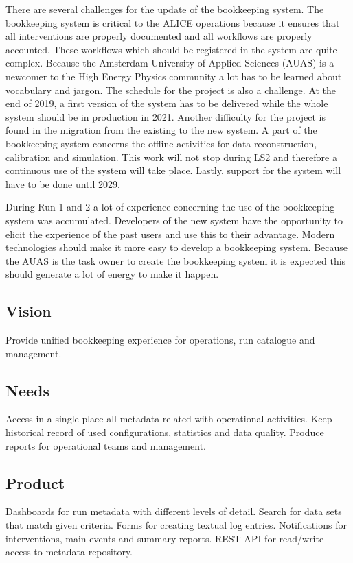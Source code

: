 There are several challenges for the update of the bookkeeping system. The bookkeeping system is critical to the ALICE operations because it ensures that all interventions are properly documented and all workflows are properly accounted. These workflows which should be registered in the system are quite complex. Because the Amsterdam University of Applied Sciences (AUAS) is a newcomer to the High Energy Physics community a lot has to be learned about vocabulary and jargon. The schedule for the project is also a challenge. At the end of 2019, a first version of the system has to be delivered while the whole system should be in production in 2021. Another difficulty for the project is found in the migration from the existing to the new system. A part of the bookkeeping system concerns the offline activities for data reconstruction, calibration and simulation. This work will not stop during LS2 and therefore a continuous use of the system will take place. Lastly, support for the system will have to be done until 2029.

During Run 1 and 2 a lot of experience concerning the use of the bookkeeping system was accumulated. Developers of the new system have the opportunity to elicit the experience of the past users and use this to their advantage. Modern technologies should make it more easy to develop a bookkeeping system. Because the AUAS is the task owner to create the bookkeeping system it is expected this should generate a lot of energy to make it happen.

\subsection{Vision}
Provide unified bookkeeping experience for operations, run catalogue and management.

\subsection{Needs}
Access in a single place all metadata related with operational activities. Keep historical record of used configurations, statistics and data quality. Produce reports for operational teams and management. 

\subsection{Product}
Dashboards for run metadata with different levels of detail. Search for data sets that match given criteria. Forms for creating textual log entries. Notifications for interventions, main events and summary reports. REST API for read/write access to metadata repository. 


